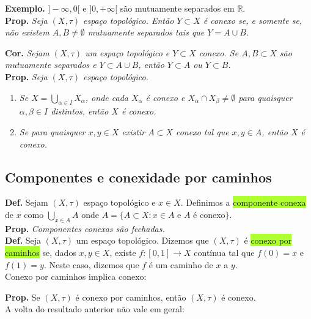 \documentclass{article}
\begin{document}
\begin{landscape}
\begin{multicols}{3}
\textbf{Exemplo.} $]-\infty, 0[$ e $]0, +\infty[$ são mutuamente separados em $\mathbb{R}$.\\

\textbf{Prop.} \textit{Seja $(X, \tau)$ espaço topológico. Então $Y \subset X$ é conexo se, e somente se, não existem $A, B \neq \emptyset$ mutuamente separados tais que $Y = A \cup B$.}

\textbf{Cor.} \textit{Sejam $(X, \tau)$ um espaço topológico e $Y \subset X$ conexo. Se $A, B \subset X$ são mutuamente separados e $Y \subset A \cup B$, então $Y \subset A$ ou $Y \subset B$.}\\

\textbf{Prop.} \textit{Seja $(X, \tau)$ espaço topológico.}
\begin{enumerate}
    \item \textit{Se $X = \bigcup_{\alpha \in I} X_\alpha$, onde cada $X_\alpha$ é conexo e $X_\alpha \cap X_\beta \neq \emptyset$ para quaisquer $\alpha, \beta \in I$ distintos, então $X$ é conexo.}
    \item \textit{Se para quaisquer $x, y \in X$ existir $A \subset X$ conexo tal que $x, y \in A$, então $X$ é conexo.}
\end{enumerate}

\subsection{Componentes e conexidade por caminhos}
\textbf{Def.} Sejam $(X,\tau)$ espaço topológico e $x \in X$. Definimos a \colorbox{GreenYellow}{componente conexa} de $x$ como $\bigcup_{x \in A} A$ onde $A = \{A \subset X : x \in A$ e $A$ é conexo$\}$.\\

\textbf{Prop.} \textit{Componentes conexas são fechadas.}\\

\textbf{Def.} Seja $(X,\tau)$ um espaço topológico. Dizemos que $(X,\tau)$ é \colorbox{GreenYellow}{conexo por caminhos} se, dados $x,y \in X$, existe $f : [0,1] \to X$ contínua tal que $f(0) = x$ e $f(1) = y$. Neste caso, dizemos que $f$ é um caminho de $x$ a $y$.\\

\color{blue!70}Conexo por caminhos implica conexo:\color{black}

\textbf{Prop.} Se $(X,\tau)$ é conexo por caminhos, então $(X,\tau)$ é conexo.\\

\color{blue!70}A volta do resultado anterior não vale em geral:\color{black}


\end{multicols}
\end{landscape}
\end{document}
